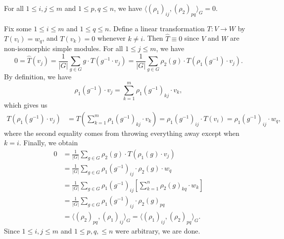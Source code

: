 \begin{theo}{}
    For all $1 \leq i, j \leq m$ and $1 \leq p, q \leq n$, we have 
    $\langle (\rho_1)_{ij}, (\rho_2)_{pq} \rangle_G = 0$. 
\end{theo}
\begin{pf}
    Fix some $1 \leq i \leq m$ and $1 \leq q \leq n$. Define a linear 
    transformation $T : V \to W$ by $T(v_i) = w_q$, and $T(v_k) = 0$
    whenever $k \neq i$. Then $\hat T \equiv 0$ since $V$ and $W$ 
    are non-isomorphic simple modules. For all $1 \leq j \leq m$, we have 
    \[ 0 = \hat T(v_j) = \frac1{|G|} \sum_{g \in G} g \cdot T(g^{-1} \cdot v_j) 
    = \frac1{|G|} \sum_{g\in G} \rho_2(g) \cdot T(\rho_1(g^{-1}) \cdot v_j). \]
    By definition, we have 
    \[ \rho_1(g^{-1}) \cdot v_j = \sum_{k=1}^m \rho_1(g^{-1})_{kj} \cdot v_k, \] 
    which gives us 
    \begin{align*}
        T(\rho_1(g^{-1}) \cdot v_j) 
        &= T \left( \sum_{k=1}^m \rho_1(g^{-1})_{kj} \cdot v_k \right) 
        = \rho_1(g^{-1})_{ij} \cdot T(v_i) 
        = \rho_1(g^{-1})_{ij} \cdot w_q, 
    \end{align*}
    where the second equality comes from throwing everything away except when 
    $k = i$. Finally, we obtain 
    \begin{align*}
        0 &= \frac1{|G|} \sum_{g\in G} \rho_2(g) \cdot T(\rho_1(g) \cdot v_j) \\ 
        &= \frac1{|G|} \sum_{g\in G} \rho_1(g^{-1})_{ij} \cdot \rho_2(g) \cdot w_q \\
        &= \frac1{|G|} \sum_{g\in G} \rho_1(g^{-1})_{ij} 
           \left[ \sum_{k=1}^n \rho_2(g)_{kq} \cdot w_k \right] \\
        &= \frac1{|G|} \sum_{g\in G} \rho_1(g^{-1})_{ij} \cdot \rho_2(g)_{pq} \\ 
        &= \langle (\rho_2)_{pq}, (\rho_1)_{ij} \rangle_G 
        = \langle (\rho_1)_{ij}, (\rho_2)_{pq} \rangle_G.
    \end{align*}
    Since $1 \leq i, j \leq m$ and $1 \leq p, q, \leq n$ were arbitrary, we 
    are done. 
\end{pf}
